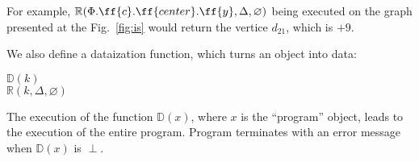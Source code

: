 For example, \(\mathbb{R}(\Phi.\ff{c}.\ff{center}.\ff{y},\Delta, \varnothing)\)
being executed on the graph presented at the
Fig.~\ref{fig:is} would return the vertice \(d_{21}\), which is \(+9\).

We also define a dataization function, which turns an object into data:

\begin{algo}
 \(\mathbb{D}(k)\) \\
  \tab {} \(\mathbb{R}(k, \Delta, \varnothing)\) \\
\end{algo}

The execution of the function \(\mathbb{D}(x)\), where \(x\) is the
``program'' object, leads to the execution of the entire program.
Program terminates with an error message when \(\mathbb{D}(x)\) is \(\perp\).

